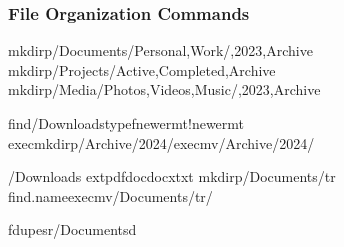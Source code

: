 \documentclass[letterpaper,10pt,english]{sphinxmanual}
\begin{document}
\subsubsection{File Organization Commands}
\label{\detokenize{data-organization:file-organization-commands}}
\begin{sphinxVerbatim}[commandchars=\\\{\}]
mkdir\PYGZhy{}p\PYGZti{}/Documents/Personal,Work/,2023,Archive
mkdir\PYGZhy{}p\PYGZti{}/Projects/Active,Completed,Archive
mkdir\PYGZhy{}p\PYGZti{}/Media/Photos,Videos,Music/,2023,Archive

find\PYGZti{}/Downloads\PYGZhy{}typef\PYGZhy{}newermt!\PYGZhy{}newermt
\PYGZhy{}execmkdir\PYGZhy{}p\PYGZti{}/Archive/2024/\PYGZhy{}execmv\PYGZti{}/Archive/2024/

\PYGZti{}/Downloads
extpdfdocdocxtxt
mkdir\PYGZhy{}p\PYGZti{}/Documents/tr
find.\PYGZhy{}name\PYGZhy{}execmv\PYGZti{}/Documents/tr/

fdupes\PYGZhy{}r\PYGZti{}/Documents\PYGZhy{}d
\end{sphinxVerbatim}
\end{document}
